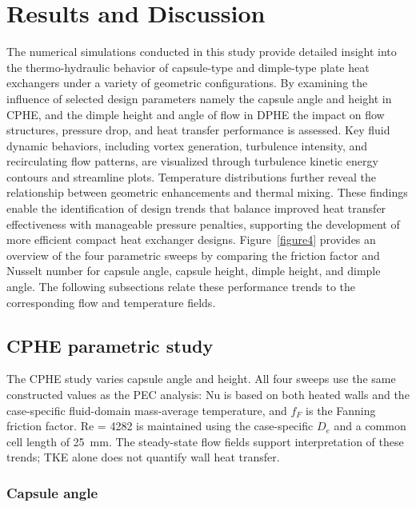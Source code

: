 \documentclass[energies,article,submit,moreauthors,noheaderline]{Definitions/mdpi}
\def\,{ }%
\begin{document}




\section{Results and Discussion}
\label{sec:results}
\label{sec:discussion}

The numerical simulations conducted in this study provide detailed insight into the thermo-hydraulic behavior of capsule-type and dimple-type plate heat exchangers under a variety of geometric configurations. By examining the influence of selected design parameters namely the capsule angle and height in CPHE, and the dimple height and angle of flow in DPHE the impact on flow structures, pressure drop, and heat transfer performance is assessed. Key fluid dynamic behaviors, including vortex generation, turbulence intensity, and recirculating flow patterns, are visualized through turbulence kinetic energy contours and streamline plots. Temperature distributions further reveal the relationship between geometric enhancements and thermal mixing. These findings enable the identification of design trends that balance improved heat transfer effectiveness with manageable pressure penalties, supporting the development of more efficient compact heat exchanger designs. Figure~\ref{figure4} provides an overview of the four parametric sweeps by comparing the friction factor and Nusselt number for capsule angle, capsule height, dimple height, and dimple angle. The following subsections relate these performance trends to the corresponding flow and temperature fields.



\subsection{CPHE parametric study}
\label{sec:cphe_results}

The CPHE study varies capsule angle and height. All four sweeps use the same constructed values as the PEC analysis: Nu is based on both heated walls and the case-specific fluid-domain mass-average temperature, and $f_F$ is the Fanning friction factor. Re\,=\,4282 is maintained using the case-specific $D_e$ and a common cell length of 25~mm. The steady-state flow fields support interpretation of these trends; TKE alone does not quantify wall heat transfer.

\subsubsection{Capsule angle}
\label{sec:disc_capsule_angle}
\end{document}
